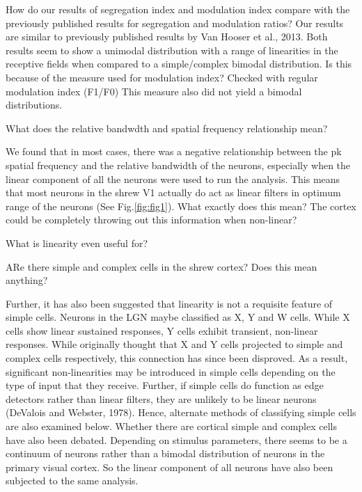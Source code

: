 		How do our results of segregation index and modulation index compare with the previously published results for segregation and modulation ratios?  Our results are similar to previously published results by Van Hooser et al., 2013. Both results seem to show a unimodal distribution with a range of linearities in the receptive fields when compared to a simple/complex bimodal distribution. Is this because of the measure used for modulation index? Checked with regular modulation index (F1/F0) This measure also did not yield a bimodal distributions.
		
		What does the relative bandwdth and spatial frequency relationship mean?
		
		We found that in most cases, there was a negative relationship between the pk spatial frequency and the relative bandwidth of the neurons, especially when the linear component of all the neurons were used to run the analysis. This means that most neurons in the shrew V1 actually do act as linear filters in optimum range of the neurons (See Fig.\ref{fig:fig1}).
		What exactly does this mean? The cortex could be completely throwing out this information when non-linear?
		
		What is linearity even useful for?
		
		ARe there simple and complex cells in the shrew cortex? Does this mean anything?
		
		
		Further, it has also been suggested that linearity is not a requisite feature of simple cells. Neurons in the LGN maybe classified as X, Y and W cells. While X cells show linear sustained responses, Y cells exhibit transient, non-linear responses. While originally thought that X and Y cells projected to simple and complex cells respectively, this connection has since been disproved. As a result, significant non-linearities may be introduced in simple cells depending on the type of input that they receive. Further, if simple cells do function as edge detectors rather than linear filters, they are unlikely to be linear neurons (DeValois and Webster, 1978). Hence, alternate methods of classifying simple cells are also examined below. 
		Whether there are cortical simple and complex cells have also been debated. Depending on stimulus parameters, there seems to be a continuum of neurons rather than a bimodal distribution of neurons in the primary visual cortex. So the linear component of all neurons have also been subjected to the same analysis.